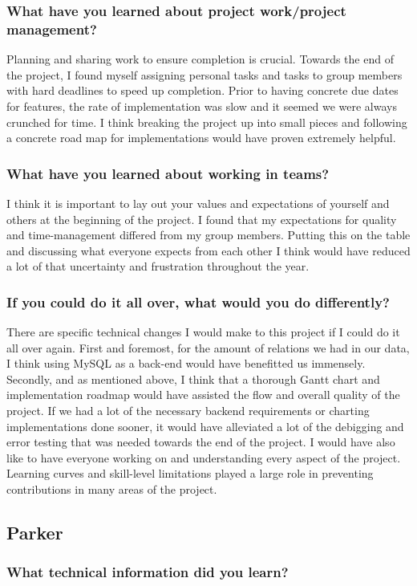 \documentclass[journal,10pt,onecolumn,compsoc]{IEEEtran}
\begin{document}
    \subsubsection{What have you learned about project work/project management?}
    Planning and sharing work to ensure completion is crucial. Towards the end of the project, I found myself assigning personal tasks and tasks to group members with hard deadlines to speed up completion. Prior to having concrete due dates for features, the rate of implementation was slow and it seemed we were always crunched for time. I think breaking the project up into small pieces and following a concrete road map for implementations would have proven extremely helpful. 
    \subsubsection{What have you learned about working in teams?}
    I think it is important to lay out your values and expectations of yourself and others at the beginning of the project. I found that my expectations for quality and time-management differed from my group members. Putting this on the table and discussing what everyone expects from each other I think would have reduced a lot of that uncertainty and frustration throughout the year. 
    \subsubsection{If you could do it all over, what would you do differently?} 
    There are specific technical changes I would make to this project if I could do it all over again. First and foremost, for the amount of relations we had in our data, I think using MySQL as a back-end would have benefitted us immensely. Secondly, and as mentioned above, I think that a thorough Gantt chart and implementation roadmap would have assisted the flow and overall quality of the project. If we had a lot of the necessary backend requirements or charting implementations done sooner, it would have alleviated a lot of the debigging and error testing that was needed towards the end of the project. I would have also like to have everyone working on and understanding every aspect of the project. Learning curves and skill-level limitations played a large role in preventing contributions in many areas of the project.
    \subsection{Parker}
    \subsubsection{What technical information did you learn?}    
\end{document}
